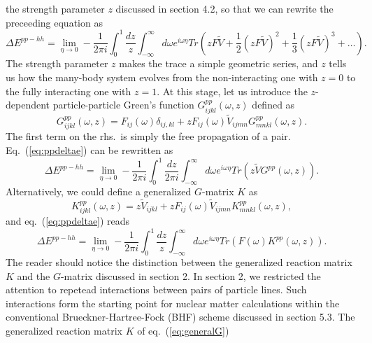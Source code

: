the strength parameter $z$ discussed in section 4.2, so that we
can rewrite the preceeding equation as
\begin{equation}
   \Delta E^{pp-hh}=\lim_{\eta \rightarrow 0}
       -\frac{1}{2\pi i}\int_0^1\frac{dz}{z}\int_{-\infty}^{\infty}
       d\omega e^{i\omega\eta}Tr\left( zF\tilde{V}+
        \frac{1}{2}(zF\tilde{V})^2+\frac{1}{3}(zF\tilde{V})^3
        +\dots\right).
        \label{eq:ppdeltae}
\end{equation}
The strength parameter $z$ makes the trace a simple geometric
series, and $z$ tells us how the many-body system evolves from the
non-interacting one with $z=0$ to the fully interacting one with $z=1$.
At this stage, let us introduce the $z$-dependent particle-particle
Green's function $G_{ijkl}^{pp}(\omega ,z)$ defined as
\begin{equation}
    G_{ijkl}^{pp}(\omega ,z)=F_{ij}(\omega )\delta_{ij,kl}
    +zF_{ij}(\omega ) \tilde{V}_{ijmn}G_{mnkl}^{pp}(\omega ,z).
\end{equation}
The first term on the rhs.\ is simply the free propagation of a pair.
Eq.\ (\ref{eq:ppdeltae}) can be rewritten as
\begin{equation}
   \Delta E^{pp-hh}=\lim_{\eta \rightarrow 0}
       -\frac{1}{2\pi i}\int_0^1\frac{dz}{2\pi i}\int_{-\infty}^{\infty}
       d\omega e^{i\omega\eta}Tr\left(
       z\tilde{V}G^{pp}(\omega ,z)
       \right).
        \label{eq:ppdeltae1}
\end{equation}
Alternatively, we could define a generalized $G$-matrix $K$ as
\begin{equation}
    K_{ijkl}^{pp}(\omega ,z)=z\tilde{V}_{ijkl}
    +zF_{ij}(\omega ) \tilde{V}_{ijmn}K_{mnkl}^{pp}(\omega ,z),
    \label{eq:generalG}
\end{equation}
and eq.\ (\ref{eq:ppdeltae}) reads
\begin{equation}
   \Delta E^{pp-hh}=\lim_{\eta \rightarrow 0}
       -\frac{1}{2\pi i}\int_0^1\frac{dz}{z}\int_{-\infty}^{\infty}
       d\omega e^{i\omega\eta}Tr\left( F(\omega )K^{pp}(\omega ,z)
        \right).
        \label{eq:ppdeltae2}
\end{equation}
The reader should notice the distinction between the generalized
reaction matrix $K$ and the $G$-matrix discussed in section 2.
In section 2, we restricted the attention to repetead interactions
between pairs of particle lines. Such interactions form the
starting point for nuclear matter calculations within the
conventional Brueckner-Hartree-Fock (BHF) scheme discussed in section
5.3. The generalized reaction matrix $K$ of eq.\ (\ref{eq:generalG})

